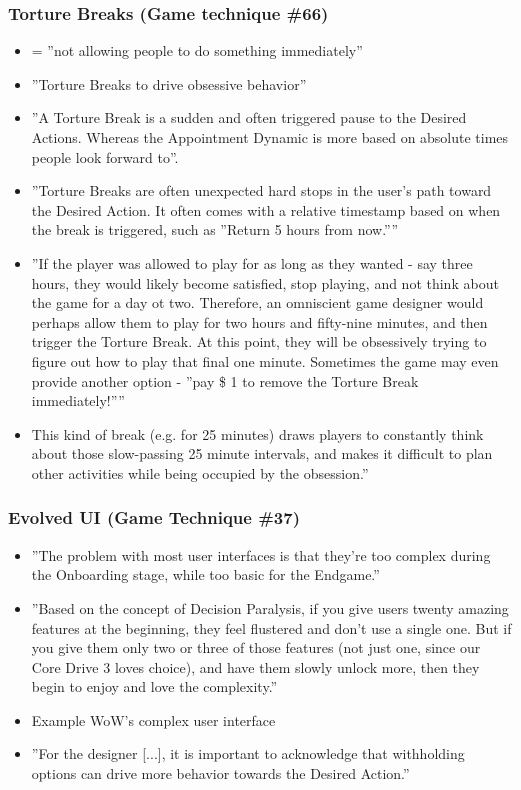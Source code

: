 \subsubsection{Torture Breaks (Game technique \#66)}
    \begin{itemize}
        \item = ''not allowing people to do something immediately''
        \item ''Torture Breaks to drive obsessive behavior''
        \item ''A Torture Break is a sudden and often triggered pause to the Desired Actions. Whereas the Appointment Dynamic is more based on absolute times people look forward to''.
        \item ''Torture Breaks are often unexpected hard stops in the user's path toward the Desired Action. It often comes with a relative timestamp based on when the break is triggered, such as ''Return 5 hours from now.''''
        \item ''If the player was allowed to play for as long as they wanted - say three hours, they would likely become satisfied, stop playing, and not think about the game for a day ot two. Therefore, an omniscient game designer would perhaps allow them to play for two hours and fifty-nine minutes, and then trigger the Torture Break. At this point, they will be obsessively trying to figure out how to play that final one minute. Sometimes the game may even provide another option - ''pay \$ 1 to remove the Torture Break immediately!''''
        \item This kind of break (e.g. for 25 minutes) draws players to constantly think about those slow-passing 25 minute intervals, and makes it difficult to plan other activities while being occupied by the obsession.''
    \end{itemize}
    
\subsubsection{Evolved UI (Game Technique \#37)}
    \begin{itemize}
        \item ''The problem with most user interfaces is that they're too complex during the Onboarding stage, while too basic for the Endgame.''
        \item ''Based on the concept of Decision Paralysis, if you give users twenty amazing features at the beginning, they feel flustered and don't use a single one. But if you give them only two or three of those features (not just one, since our Core Drive 3 loves choice), and have them slowly unlock more, then they begin to enjoy and love the complexity.''
        \item Example WoW's complex user interface
        \item ''For the designer [...], it is important to acknowledge that withholding options can drive more behavior towards the Desired Action.''
    \end{itemize}
    
